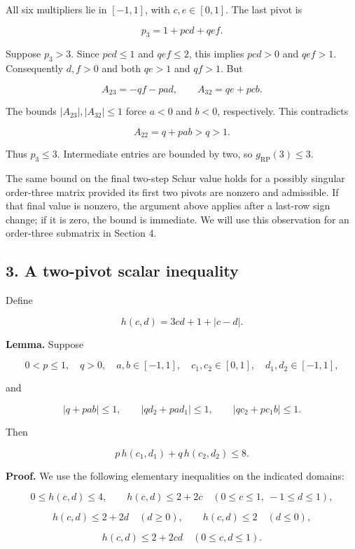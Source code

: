 \documentclass[10pt,a4paper]{article}
\begin{document}
All six multipliers lie in \([-1,1]\), with \(c,e\in[0,1]\). The last
pivot is

\[
p_3=1+pcd+qef.
\]

Suppose \(p_3>3\). Since \(pcd\le1\) and \(qef\le2\), this implies
\(pcd>0\) and \(qef>1\). Consequently \(d,f>0\) and both \(qe>1\) and
\(qf>1\). But

\[
A_{23}=-qf-pad,\qquad A_{32}=qe+pcb.
\]

The bounds \(|A_{23}|,|A_{32}|\le1\) force \(a<0\) and \(b<0\),
respectively. This contradicts

\[
A_{22}=q+pab>q>1.
\]

Thus \(p_3\le3\). Intermediate entries are bounded by two, so
\(g_{\mathrm{RP}}(3)\le3\).

The same bound on the final two-step Schur value holds for a possibly
singular order-three matrix provided its first two pivots are nonzero
and admissible. If that final value is nonzero, the argument above
applies after a last-row sign change; if it is zero, the bound is
immediate. We will use this observation for an order-three submatrix in
Section 4.


\subsection{3. A two-pivot scalar
inequality}\label{a-two-pivot-scalar-inequality}

Define

\[
h(c,d)=3cd+1+|c-d|.
\]

\textbf{Lemma.} Suppose

\[
0<p\le1,\quad q>0,\quad a,b\in[-1,1],
\quad c_1,c_2\in[0,1],\quad d_1,d_2\in[-1,1],
\]

and

\[
|q+pab|\le1,\qquad
|qd_2+pa d_1|\le1,\qquad
|qc_2+pc_1b|\le1.
\tag{4}
\]

Then

\[
p\,h(c_1,d_1)+q\,h(c_2,d_2)\le8.
\tag{5}
\]

\textbf{Proof.} We use the following elementary inequalities on the
indicated domains:

\[
0\le h(c,d)\le4,\qquad h(c,d)\le2+2c
\quad(0\le c\le1,\ -1\le d\le1),
\tag{6}
\]

\[
h(c,d)\le2+2d\quad(d\ge0),\qquad
h(c,d)\le2\quad(d\le0),
\tag{7}
\]

\[
h(c,d)\le2+2cd\quad(0\le c,d\le1).
\tag{8}
\]
\end{document}
